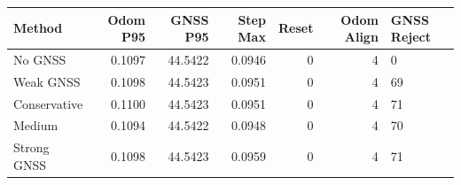 \begin{tabular}{lrrrrr}
\hline
Method & Odom P95 & GNSS P95 & Step Max & Reset & Odom Align & GNSS Reject \\
\hline
No GNSS & 0.1097 & 44.5422 & 0.0946 & 0 & 4 & 0 \\
Weak GNSS & 0.1098 & 44.5423 & 0.0951 & 0 & 4 & 69 \\
Conservative & 0.1100 & 44.5423 & 0.0951 & 0 & 4 & 71 \\
Medium & 0.1094 & 44.5422 & 0.0948 & 0 & 4 & 70 \\
Strong GNSS & 0.1098 & 44.5423 & 0.0959 & 0 & 4 & 71 \\
\hline
\end{tabular}
